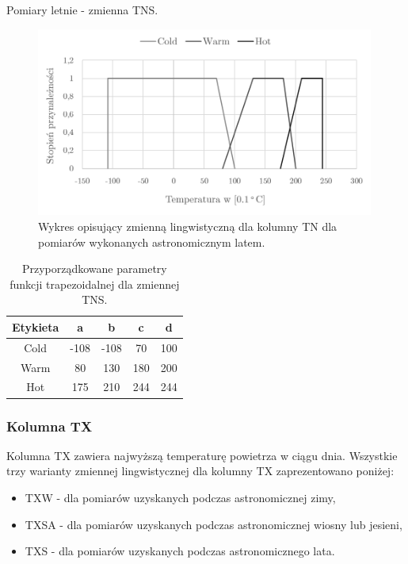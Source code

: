\documentclass{classrep}
\begin{document}
Pomiary letnie - zmienna TNS.
\begin{figure}[H]
	\centering
	\includegraphics[width=0.99\textwidth]{Pictures/TermsCharts/TN_L.png}
	\caption{Wykres opisujący zmienną lingwistyczną dla kolumny TN dla pomiarów wykonanych astronomicznym latem.}
\end{figure}

\begin{table}[H]
	\centering
	\begin{tabular}{c c c c c} 
		\hline
		\textbf{Etykieta} & \textbf{a} & \textbf{b} & \textbf{c} & \textbf{d}\\ [0.5ex] 
		\hline
		\hline 
Cold	 &-108 & -108 & 70 & 100 \\
Warm & 80 & 130 & 180 & 200 \\
Hot	 & 175 & 210 & 244 & 244 \\
		\hline
	\end{tabular}
	\caption{Przyporządkowane parametry funkcji trapezoidalnej dla zmiennej TNS.}
\end{table}

\clearpage




\subsubsection{Kolumna TX}
Kolumna TX zawiera najwyższą temperaturę powietrza w ciągu dnia. Wszystkie trzy warianty zmiennej lingwistycznej dla kolumny TX zaprezentowano poniżej:

\begin{itemize}[label=$\bullet$\scshape\bfseries]
\item TXW - dla pomiarów uzyskanych podczas astronomicznej zimy,
\item TXSA - dla pomiarów uzyskanych podczas astronomicznej wiosny lub jesieni,
\item TXS - dla pomiarów uzyskanych podczas astronomicznego lata.\newline\newline\newline
\end{itemize}
\end{document}
